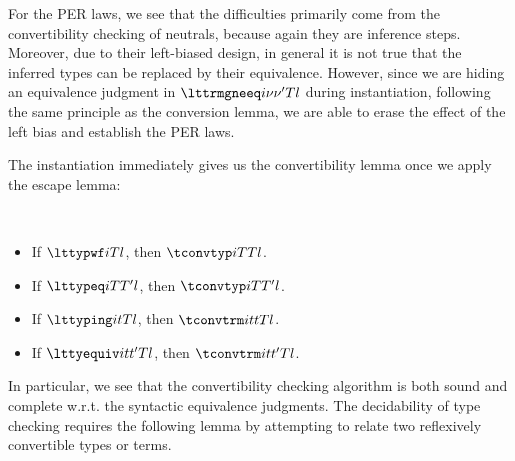 For the PER laws, we see that the difficulties primarily come from the convertibility
checking of neutrals, because again they are inference steps. %
Moreover, due to their left-biased design, in general it is not true that the inferred
types can be replaced by their equivalence. %
However, since we are hiding an equivalence judgment in $\lttrmgneeq i \nu{\nu'} T l$
during instantiation, following the same principle as the conversion lemma, we are
able to erase the effect of the left bias and establish the PER laws. %

The instantiation immediately gives us the convertibility lemma once we apply the
escape lemma:
\begin{theorem}[Convertibility] $ $
  \begin{itemize}
  \item If $\lttypwf i T l$, then $\tconvtyp i T T l$. 
  \item If $\lttypeq i T{T'} l$, then $\tconvtyp i T{T'} l$. 
  \item If $\lttyping i t T l$, then $\tconvtrm i t t T l$.
  \item If $\lttyequiv i t{t'} T l$, then $\tconvtrm i t{t'} T l$.
  \end{itemize}
\end{theorem}
In particular, we see that the convertibility checking algorithm is both sound and
complete w.r.t. the syntactic equivalence judgments. %
The decidability of type checking requires the following lemma by attempting to relate
two reflexively convertible types or terms. 

